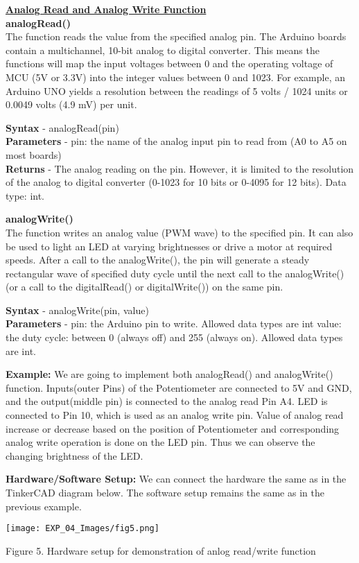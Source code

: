 \documentclass[12pt,a4paper]{article}
\begin{document}
\setlength{\parindent}{0eM}
\begin{justify}
\textbf{\underline{Analog Read and Analog Write Function}}\\[3pt]
\textbf{analogRead()}\\[6pt]
\noindent The function reads the value from the specified analog pin. The Arduino boards contain a multichannel, 10-bit analog to digital converter. This means the functions will map the input voltages between 0 and the operating voltage of MCU (5V or 3.3V) into the integer values between 0 and 1023. For example, an Arduino UNO yields a resolution between the readings of 5 volts / 1024 units or 0.0049 volts (4.9 mV) per unit.\par
\noindent \textbf{Syntax }- analogRead(pin)\\[3pt]
\textbf{Parameters }- pin: the name of the analog input pin to read from (A0 to A5 on most boards)\\[3pt]
\textbf{Returns} - The analog reading on the pin. However, it is limited to the resolution of the analog to digital converter (0-1023 for 10 bits or 0-4095 for 12 bits). Data type: int.\par
\noindent \textbf{analogWrite()}\\[3pt]
The function writes an analog value (PWM wave) to the specified pin. It can also be used to light an LED at varying brightnesses or drive a motor at required speeds. After a call to the analogWrite(), the pin will generate a steady rectangular wave of specified duty cycle until the next call to the analogWrite() (or a call to the digitalRead() or digitalWrite()) on the same pin.\par
\noindent \textbf{Syntax} - analogWrite(pin, value)\\[3pt]
\textbf{Parameters} - pin: the Arduino pin to write. Allowed data types are int value: the duty cycle: between 0 (always off) and 255 (always on). Allowed data types are int.\par
\noindent \textbf{Example: } We are going to implement both analogRead() and analogWrite() function. Inputs(outer Pins) of the Potentiometer are connected to 5V and GND, and the output(middle pin) is connected to the analog read Pin A4. LED is connected to Pin 10, which is used as an analog write pin. Value of analog read increase or decrease based on the position of Potentiometer and corresponding analog write operation is done on the LED pin. Thus we can observe the changing brightness of the LED.\par
\noindent \textbf{Hardware/Software Setup: } We can connect the hardware the same as in the TinkerCAD diagram below. The software setup remains the same as in the previous example.
\end{justify}
\vspace{-4mm}
\begin{center} 
\texttt{[image: EXP\_04\_Images/fig5.png]}
\end{center}
\vspace{-7mm}
\begin{center} {Figure 5. Hardware setup for demonstration of anlog read/write function}\end{center}
\vspace{-3mm}
\end{document}
